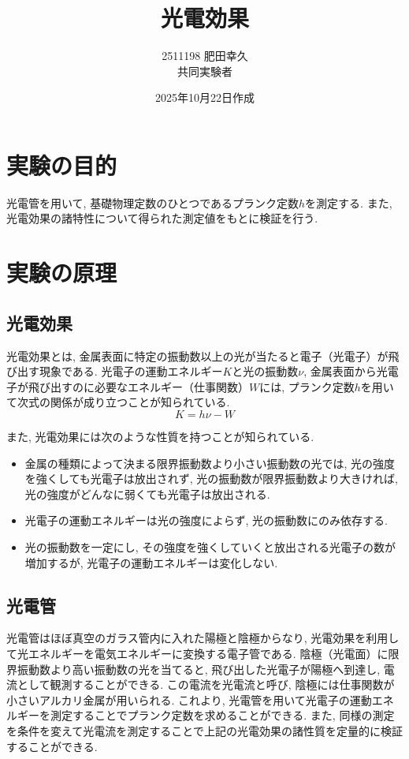 \documentclass{jarticle}
\title{光電効果}
\author{2511198 肥田幸久 \\ 共同実験者 \\ }
\date{2025年10月22日作成}
\begin{document}
\maketitle



\section{実験の目的}

光電管を用いて, 基礎物理定数のひとつであるプランク定数$h$を測定する.
また, 光電効果の諸特性について得られた測定値をもとに検証を行う.



\section{実験の原理}


\subsection{光電効果}

光電効果とは, 金属表面に特定の振動数以上の光が当たると電子（光電子）が飛び出す現象である.
光電子の運動エネルギー$K$と光の振動数$\nu$, 金属表面から光電子が飛び出すのに必要なエネルギー（仕事関数）$W$には, プランク定数$h$を用いて次式の関係が成り立つことが知られている.
\begin{equation}
  K = h\nu - W
\end{equation}

また, 光電効果には次のような性質を持つことが知られている.
\begin{itemize}
  \item 金属の種類によって決まる限界振動数より小さい振動数の光では, 光の強度を強くしても光電子は放出されず, 光の振動数が限界振動数より大きければ, 光の強度がどんなに弱くても光電子は放出される.
  \item 光電子の運動エネルギーは光の強度によらず, 光の振動数にのみ依存する.
  \item 光の振動数を一定にし, その強度を強くしていくと放出される光電子の数が増加するが, 光電子の運動エネルギーは変化しない.
\end{itemize}


\subsection{光電管}

光電管はほぼ真空のガラス管内に入れた陽極と陰極からなり, 光電効果を利用して光エネルギーを電気エネルギーに変換する電子管である.
陰極（光電面）に限界振動数より高い振動数の光を当てると, 飛び出した光電子が陽極へ到達し, 電流として観測することができる.
この電流を光電流と呼び, 陰極には仕事関数が小さいアルカリ金属が用いられる.
これより, 光電管を用いて光電子の運動エネルギーを測定することでプランク定数を求めることができる.
また, 同様の測定を条件を変えて光電流を測定することで上記の光電効果の諸性質を定量的に検証することができる.
\end{document}
